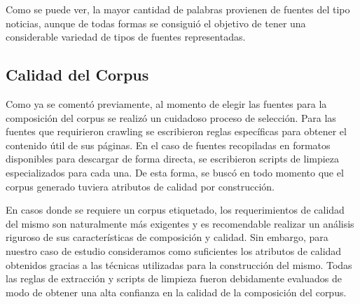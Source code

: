 Como se puede ver, la mayor cantidad de palabras provienen de fuentes del tipo noticias,
aunque de todas formas se consiguió el objetivo de tener una considerable variedad de
tipos de fuentes representadas.


\subsection{Calidad del Corpus}

Como ya se comentó previamente, al momento de elegir las fuentes para la composición
del corpus se realizó un cuidadoso proceso de selección. Para las fuentes que requirieron
crawling se escribieron reglas específicas para obtener el contenido útil de sus páginas. En
el caso de fuentes recopiladas en formatos disponibles para descargar de forma directa, se
escribieron scripts de limpieza especializados para cada una. De esta forma, se buscó en
todo momento que el corpus generado tuviera atributos de calidad por construcción.

En casos donde se requiere un corpus etiquetado, los requerimientos de calidad del mismo
son naturalmente más exigentes y es recomendable realizar un análisis riguroso de sus
características de composición y calidad. Sin embargo, para nuestro caso de estudio
consideramos como suficientes los atributos de calidad obtenidos gracias a las técnicas
utilizadas para la construcción del mismo. Todas las reglas de extracción y scripts de
limpieza fueron debidamente evaluados de modo de obtener una alta confianza en la calidad
de la composición del corpus.
